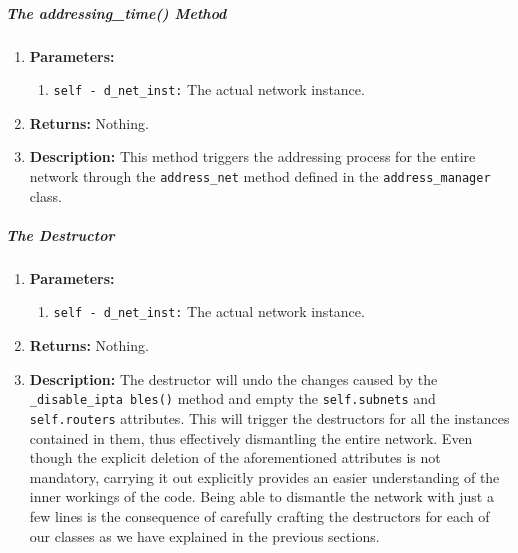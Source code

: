        \subparagraph{The addressing\_time() Method}
            \begin{enumerate}
                \item \textbf{Parameters:}
                \begin{enumerate}
                    \item \texttt{self - d\_net\_inst:} The actual network instance.
                \end{enumerate}
                \item \textbf{Returns:} Nothing.
                \item \textbf{Description:} This method triggers the addressing process for the entire network through the \texttt{address\_net} method defined in the \texttt{address\_manager} class.
            \end{enumerate}

        \subparagraph{The Destructor}
            \begin{enumerate}
                \item \textbf{Parameters:}
                \begin{enumerate}
                    \item \texttt{self - d\_net\_inst:} The actual network instance.
                \end{enumerate}
                \item \textbf{Returns:} Nothing.
                \item \textbf{Description:} The destructor will undo the changes caused by the \texttt{\_disable\_ipta bles()} method and empty the \texttt{self.subnets} and \texttt{self.routers} attributes. This will trigger the destructors for all the instances contained in them, thus effectively dismantling the entire network. Even though the explicit deletion of the aforementioned attributes is not mandatory, carrying it out explicitly provides an easier understanding of the inner workings of the code. Being able to dismantle the network with just a few lines is the consequence of carefully crafting the destructors for each of our classes as we have explained in the previous sections.
            \end{enumerate}
